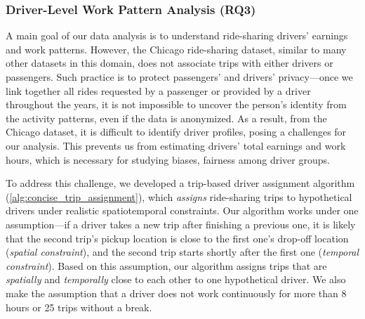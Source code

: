 
\subsubsection{Driver-Level Work Pattern Analysis (RQ3)}
\label{sec:methods-driver-simulation}


A main goal of our data analysis is to understand ride-sharing drivers' earnings and work patterns. However, the Chicago ride-sharing dataset, similar to many other datasets in this domain, does not associate trips with either drivers or passengers. Such practice is to protect passengers' and drivers' privacy---once we link together all rides requested by a passenger or provided by a driver throughout the years, it is not impossible to uncover the person's identity from the activity patterns, even if the data is anonymized. As a result, from the Chicago dataset, it is difficult to identify driver profiles, posing a challenges for our analysis. This prevents us from estimating drivers' total earnings and work hours, which is necessary for studying biases, fairness among driver groups.

To address this challenge, we developed a trip-based driver assignment algorithm (\cref{alg:concise_trip_assignment}), which \emph{assigns} ride-sharing trips to hypothetical drivers under realistic spatiotemporal constraints. Our algorithm works under one assumption---if a driver takes a new trip after finishing a previous one, it is likely that the second trip's pickup location is close to the first one's drop-off location (\textit{spatial constraint}), and the second trip starts shortly after the first one (\textit{temporal constraint}). Based on this assumption, our algorithm assigns trips that are \textit{spatially} and \textit{temporally} close to each other to one hypothetical driver. We also make the assumption that a driver does not work continuously for more than 8 hours or 25 trips without a break.


